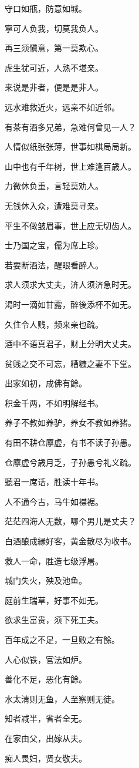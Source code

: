 \documentclass[12pt,oneside]{book}
\begin{document}
守口如甁，防意如城。

寧可人负我，切莫我负人。

再三须愼意，第一莫欺心。

虎生犹可近，人熟不堪亲。

来说是非者，便是是非人。

远水难救近火，远亲不如近邻。

有茶有酒多兄弟，急难何曾见一人？

人情似纸张张薄，世事如棋局局新。

山中也有千年树，世上难逢百歳人。

力微休负重，言轻莫劝人。

无钱休入众，遭难莫寻亲。

平生不做皱眉事，世上应无切齿人。

士乃国之宝，儒为席上珍。

若要断酒法，醒眼看醉人。

求人须求大丈夫，济人须济急时无。

渇时一滴如甘露，醉後添杯不如无。

久住令人贱，频来亲也疏。

酒中不语真君子，财上分明大丈夫。

贫贱之交不可忘，糟糠之妻不下堂。

出家如初，成佛有餘。

积金千两，不如明解经书。

养子不教如养驴，养女不教如养猪。

有田不耕仓廪虚，有书不读子孙愚。

仓廪虚兮歳月乏，子孙愚兮礼义疏。

聽君一席话，胜读十年书。

人不通今古，马牛如襟裾。

茫茫四海人无数，哪个男儿是丈夫？

白酒酿成縁好客，黄金散尽为收书。

救人一命，胜造七级浮屠。

城门失火，殃及池鱼。

庭前生瑞草，好事不如无。

欲求生富贵，须下死工夫。

百年成之不足，一旦败之有餘。

人心似铁，官法如炉。

善化不足，恶化有餘。

水太淸则无鱼，人至察则无徒。

知者减半，省者全无。

在家由父，出嫁从夫。

痴人畏妇，贤女敬夫。
\end{document}
